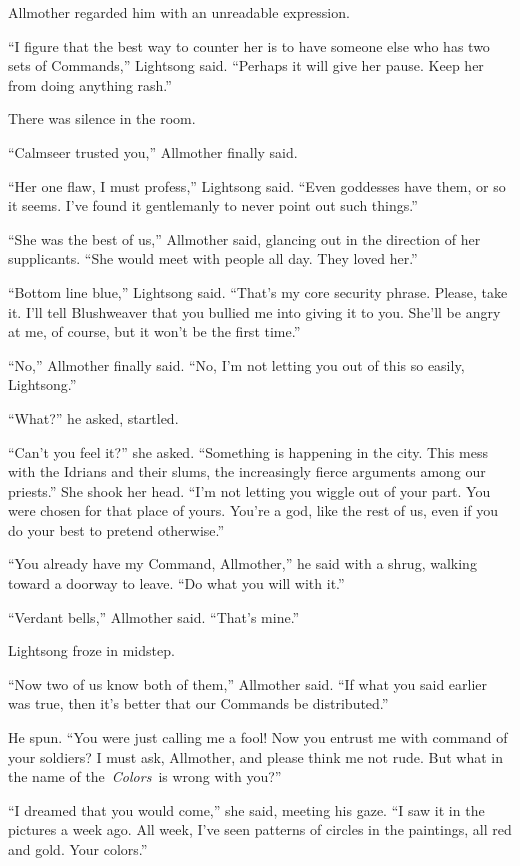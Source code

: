 Allmother regarded him with an unreadable expression.

“I figure that the best way to counter her is to have someone else who has two sets of Commands,” Lightsong said. “Perhaps it will give her pause. Keep her from doing anything rash.”

There was silence in the room.

“Calmseer trusted you,” Allmother finally said.

“Her one flaw, I must profess,” Lightsong said. “Even goddesses have them, or so it seems. I’ve found it gentlemanly to never point out such things.”

“She was the best of us,” Allmother said, glancing out in the direction of her supplicants. “She would meet with people all day. They loved her.”

“Bottom line blue,” Lightsong said. “That’s my core security phrase. Please, take it. I’ll tell Blushweaver that you bullied me into giving it to you. She’ll be angry at me, of course, but it won’t be the first time.”

“No,” Allmother finally said. “No, I’m not letting you out of this so easily, Lightsong.”

“What?” he asked, startled.

“Can’t you feel it?” she asked. “Something is happening in the city. This mess with the Idrians and their slums, the increasingly fierce arguments among our priests.” She shook her head. “I’m not letting you wiggle out of your part. You were chosen for that place of yours. You’re a god, like the rest of us, even if you do your best to pretend otherwise.”

“You already have my Command, Allmother,” he said with a shrug, walking toward a doorway to leave. “Do what you will with it.”

“Verdant bells,” Allmother said. “That’s mine.”

Lightsong froze in midstep.

“Now two of us know both of them,” Allmother said. “If what you said earlier was true, then it’s better that our Commands be distributed.”

He spun. “You were just calling me a fool! Now you entrust me with command of your soldiers? I must ask, Allmother, and please think me not rude. But what in the name of the~\textit{Colors}~is wrong with you?”

“I dreamed that you would come,” she said, meeting his gaze. “I saw it in the pictures a week ago. All week, I’ve seen patterns of circles in the paintings, all red and gold. Your colors.”

